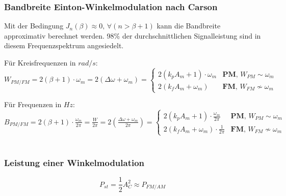 \newpage
\subsubsection{Bandbreite Einton-Winkelmodulation nach Carson}
	Mit der Bedingung $J_n(\beta) \approx 0, \,\forall (n > \beta + 1)$ kann die Bandbreite approximativ berechnet werden. 98\% der durchschnittlichen Signalleistung sind in diesem Frequenzspektrum angesiedelt. 

	Für Kreisfrequenzen in $rad/s$: \quad $\boxed{W_{PM/FM} = 2(\beta + 1) \cdot \omega_m} = 2(\Delta \omega + \omega_m) =
	\begin{cases}
		2(k_p A_m + 1)\cdot \omega_m & \textbf{PM},\, W_{PM} \sim \omega_m \\
		2(k_f A_m + \omega_m) & \textbf{FM},\, W_{FM} \nsim \omega_m
	\end{cases}$
	
	Für Frequenzen in $Hz$: \qquad $\boxed{B_{PM/FM} = 2(\beta + 1) \cdot \frac{\omega_m}{2 \pi}} = \frac{W}{2\pi} = 2(\frac{\Delta \omega + \omega_m}{2 \pi}) =
	\begin{cases}
		2(k_p A_m + 1)\cdot \frac{\omega_m}{2 \pi} & \textbf{PM},\, W_{PM} \sim \omega_m \\
		2(k_f A_m + \omega_m) \cdot \frac{1}{2 \pi} & \textbf{FM},\, W_{FM} \nsim \omega_m
	\end{cases}$ \\ \\


\subsubsection{Leistung einer Winkelmodulation }
$$P_{st} = \frac12 A_C^2 \approx P_{FM/AM}$$


